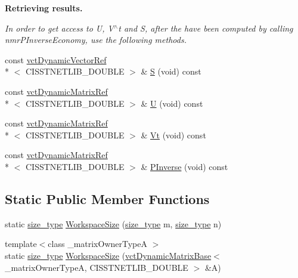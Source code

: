 \begin{Indent}{\bf Retrieving results.}\par
{\em In order to get access to U, V$^\wedge$t and S, after the have been computed by calling nmr\-P\-Inverse\-Economy, use the following methods. }\begin{DoxyCompactItemize}
\item 
const \hyperlink{classvct_dynamic_vector_ref}{vct\-Dynamic\-Vector\-Ref}\\*
$<$ C\-I\-S\-S\-T\-N\-E\-T\-L\-I\-B\-\_\-\-D\-O\-U\-B\-L\-E $>$ \& \hyperlink{classnmr_p_inverse_economy_dynamic_data_a26c147031eb1e598986be57d7a35c2a7}{S} (void) const 
\item 
const \hyperlink{classvct_dynamic_matrix_ref}{vct\-Dynamic\-Matrix\-Ref}\\*
$<$ C\-I\-S\-S\-T\-N\-E\-T\-L\-I\-B\-\_\-\-D\-O\-U\-B\-L\-E $>$ \& \hyperlink{classnmr_p_inverse_economy_dynamic_data_af9d54fcba81ce6fc2f3a0aa4962e4919}{U} (void) const 
\item 
const \hyperlink{classvct_dynamic_matrix_ref}{vct\-Dynamic\-Matrix\-Ref}\\*
$<$ C\-I\-S\-S\-T\-N\-E\-T\-L\-I\-B\-\_\-\-D\-O\-U\-B\-L\-E $>$ \& \hyperlink{classnmr_p_inverse_economy_dynamic_data_a7ed2916c0f61e4097800ed3b7f548c3d}{Vt} (void) const 
\item 
const \hyperlink{classvct_dynamic_matrix_ref}{vct\-Dynamic\-Matrix\-Ref}\\*
$<$ C\-I\-S\-S\-T\-N\-E\-T\-L\-I\-B\-\_\-\-D\-O\-U\-B\-L\-E $>$ \& \hyperlink{classnmr_p_inverse_economy_dynamic_data_a9e07241a84c9b0f93f785246ea587b58}{P\-Inverse} (void) const 
\end{DoxyCompactItemize}
\end{Indent}
\subsection*{Static Public Member Functions}
\begin{DoxyCompactItemize}
\item 
static \hyperlink{classnmr_p_inverse_economy_dynamic_data_a32ab8d601abf927292b49d0cea124f9b}{size\-\_\-type} \hyperlink{classnmr_p_inverse_economy_dynamic_data_a157edf445675cef52065e27cd674a8cb}{Workspace\-Size} (\hyperlink{classnmr_p_inverse_economy_dynamic_data_a32ab8d601abf927292b49d0cea124f9b}{size\-\_\-type} m, \hyperlink{classnmr_p_inverse_economy_dynamic_data_a32ab8d601abf927292b49d0cea124f9b}{size\-\_\-type} n)
\item 
{\footnotesize template$<$class \-\_\-matrix\-Owner\-Type\-A $>$ }\\static \hyperlink{classnmr_p_inverse_economy_dynamic_data_a32ab8d601abf927292b49d0cea124f9b}{size\-\_\-type} \hyperlink{classnmr_p_inverse_economy_dynamic_data_af2e31c82ffaef1be276bff9d009e338a}{Workspace\-Size} (\hyperlink{classvct_dynamic_matrix_base}{vct\-Dynamic\-Matrix\-Base}$<$ \-\_\-matrix\-Owner\-Type\-A, C\-I\-S\-S\-T\-N\-E\-T\-L\-I\-B\-\_\-\-D\-O\-U\-B\-L\-E $>$ \&A)
\end{DoxyCompactItemize}
